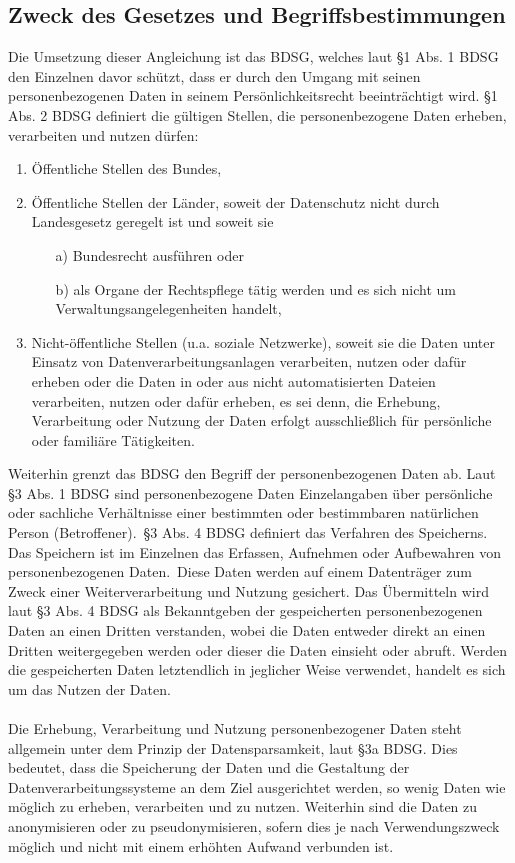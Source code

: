 \subsection{Zweck des Gesetzes und Begriffsbestimmungen}
Die Umsetzung dieser Angleichung ist das \ac{BDSG}, welches laut \S 1 Abs. 1 BDSG den Einzelnen davor schützt, dass er durch den Umgang mit seinen personenbezogenen Daten in seinem Persönlichkeitsrecht beeinträchtigt wird. \S 1 Abs. 2 BDSG definiert die gültigen Stellen, die personenbezogene Daten erheben, verarbeiten und nutzen dürfen:
\begin{enumerate}
\item Öffentliche Stellen des Bundes,
\item Öffentliche Stellen der Länder, soweit der Datenschutz nicht durch Landesgesetz geregelt ist und soweit sie
\begin{itemize}
\item[a)] Bundesrecht ausführen oder
\item[b)] als Organe der Rechtspflege tätig werden und es sich nicht um Verwaltungsangelegenheiten handelt,
\end{itemize}
\item Nicht-öffentliche Stellen (u.a. soziale Netzwerke), soweit sie die Daten unter Einsatz von Datenverarbeitungsanlagen verarbeiten, nutzen oder dafür erheben oder die Daten in oder aus nicht automatisierten Dateien verarbeiten, nutzen oder dafür erheben, es sei denn, die Erhebung, Verarbeitung oder Nutzung der Daten erfolgt ausschließlich für persönliche oder familiäre Tätigkeiten.
\end{enumerate}
Weiterhin grenzt das BDSG den Begriff der personenbezogenen Daten ab. Laut \S 3 Abs. 1 BDSG \glqq sind personenbezogene Daten Einzelangaben über persönliche oder sachliche Verhältnisse einer bestimmten oder bestimmbaren natürlichen Person (Betroffener).\grqq \ \S 3 Abs. 4 BDSG definiert das Verfahren des Speicherns. Das Speichern ist im Einzelnen das \glqq Erfassen, Aufnehmen oder Aufbewahren von personenbezogenen Daten.\grqq \ Diese Daten werden auf einem Datenträger zum Zweck einer Weiterverarbeitung und Nutzung gesichert. Das Übermitteln wird laut \S 3 Abs. 4 BDSG als Bekanntgeben der gespeicherten personenbezogenen Daten an einen Dritten verstanden, wobei die Daten entweder direkt an einen Dritten weitergegeben werden oder dieser die Daten einsieht oder abruft. Werden die gespeicherten Daten letztendlich in jeglicher Weise verwendet, handelt es sich um das Nutzen der Daten.\\
\\Die Erhebung, Verarbeitung und Nutzung personenbezogener Daten steht allgemein unter dem Prinzip der Datensparsamkeit, laut §3a BDSG. Dies bedeutet, dass die Speicherung der Daten und die Gestaltung der Datenverarbeitungssysteme an dem Ziel ausgerichtet werden, so wenig Daten wie möglich zu erheben, verarbeiten und zu nutzen. Weiterhin sind die Daten zu anonymisieren oder zu pseudonymisieren, sofern dies je nach Verwendungszweck möglich und nicht mit einem erhöhten Aufwand verbunden ist.
